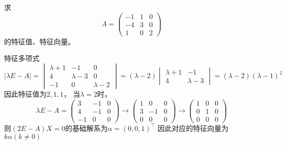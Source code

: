 \begin{example}
    求
    \[
        A =
        \begin{pmatrix}
            -1 & 1 & 0 \\
            -4 & 3 & 0 \\
            1  & 0 & 2
        \end{pmatrix}
    \]
    的特征值、特征向量。
\end{example}
\begin{solution}
    特征多项式
    \[
        |\lambda E - A|
        =
        \begin{vmatrix}
            \lambda+1 & -1        & 0         \\
            4         & \lambda-3 & 0         \\
            -1        & 0         & \lambda-2
        \end{vmatrix}
        =(\lambda-2)
        \begin{vmatrix}
            \lambda+1 & -1        \\
            4         & \lambda-3
        \end{vmatrix}
        = (\lambda-2)(\lambda-1)^2
    \]
    因此特征值为$2,1,1$，
    当$\lambda = 2$时，
    \[
        \lambda E - A =
        \begin{pmatrix}
            3  & -1 & 0 \\
            4  & -1 & 0 \\
            -1 & 0  & 0
        \end{pmatrix}
        \longrightarrow
        \begin{pmatrix}
            1 & 0  & 0 \\
            3 & -1 & 0 \\
            0 & 0  & 0
        \end{pmatrix}
        \longrightarrow
        \begin{pmatrix}
            1 & 0 & 0 \\
            0 & 1 & 0 \\
            0 & 0 & 0
        \end{pmatrix}
    \]
    则$(2E-A)X=0$的基础解系为$\alpha = (0,0,1)^\intercal$
    因此对应的特征向量为$k\alpha (k\neq 0)$


\end{solution}
